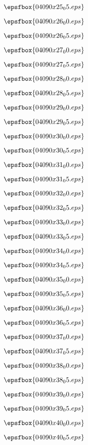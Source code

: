 \vfil \eject
$$\epsfbox{04090x25_05.eps}$$ 

\vfil \eject
$$\epsfbox{04090x26_00.eps}$$ 

\vfil \eject
$$\epsfbox{04090x26_05.eps}$$ 

\vfil \eject
$$\epsfbox{04090x27_00.eps}$$ 

\vfil \eject
$$\epsfbox{04090x27_05.eps}$$ 

\vfil \eject
$$\epsfbox{04090x28_00.eps}$$ 

\vfil \eject
$$\epsfbox{04090x28_05.eps}$$ 

\vfil \eject
$$\epsfbox{04090x29_00.eps}$$ 

\vfil \eject
$$\epsfbox{04090x29_05.eps}$$ 

\vfil \eject
$$\epsfbox{04090x30_00.eps}$$ 

\vfil \eject
$$\epsfbox{04090x30_05.eps}$$ 

\vfil \eject
$$\epsfbox{04090x31_00.eps}$$ 

\vfil \eject
$$\epsfbox{04090x31_05.eps}$$ 

\vfil \eject
$$\epsfbox{04090x32_00.eps}$$ 

\vfil \eject
$$\epsfbox{04090x32_05.eps}$$ 

\vfil \eject
$$\epsfbox{04090x33_00.eps}$$ 

\vfil \eject
$$\epsfbox{04090x33_05.eps}$$ 

\vfil \eject
$$\epsfbox{04090x34_00.eps}$$ 

\vfil \eject
$$\epsfbox{04090x34_05.eps}$$ 

\vfil \eject
$$\epsfbox{04090x35_00.eps}$$ 

\vfil \eject
$$\epsfbox{04090x35_05.eps}$$ 

\vfil \eject
$$\epsfbox{04090x36_00.eps}$$ 

\vfil \eject
$$\epsfbox{04090x36_05.eps}$$ 

\vfil \eject
$$\epsfbox{04090x37_00.eps}$$ 

\vfil \eject
$$\epsfbox{04090x37_05.eps}$$ 

\vfil \eject
$$\epsfbox{04090x38_00.eps}$$ 

\vfil \eject
$$\epsfbox{04090x38_05.eps}$$ 

\vfil \eject
$$\epsfbox{04090x39_00.eps}$$ 

\vfil \eject
$$\epsfbox{04090x39_05.eps}$$ 

\vfil \eject
$$\epsfbox{04090x40_00.eps}$$ 

\vfil \eject
$$\epsfbox{04090x40_05.eps}$$ 

